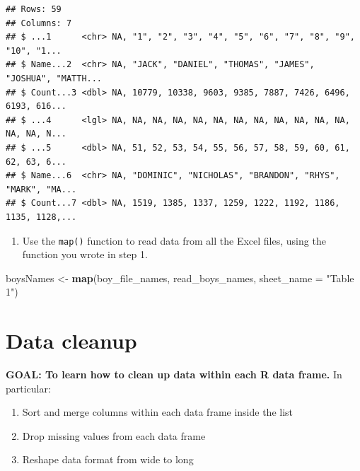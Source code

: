 \documentclass[
]{book}
\newenvironment{Shaded}{\begin{snugshade}}{\end{snugshade}}
\newcommand{\DataTypeTok}[1]{\textcolor[rgb]{0.13,0.29,0.53}{#1}}
\newcommand{\KeywordTok}[1]{\textcolor[rgb]{0.13,0.29,0.53}{\textbf{#1}}}
\newcommand{\NormalTok}[1]{#1}
\newcommand{\StringTok}[1]{\textcolor[rgb]{0.31,0.60,0.02}{#1}}
\providecommand{\tightlist}{%
  \setlength{\itemsep}{0pt}\setlength{\parskip}{0pt}}
\begin{document}
\begin{alert}
\begin{verbatim}
## Rows: 59
## Columns: 7
## $ ...1      <chr> NA, "1", "2", "3", "4", "5", "6", "7", "8", "9", "10", "1...
## $ Name...2  <chr> NA, "JACK", "DANIEL", "THOMAS", "JAMES", "JOSHUA", "MATTH...
## $ Count...3 <dbl> NA, 10779, 10338, 9603, 9385, 7887, 7426, 6496, 6193, 616...
## $ ...4      <lgl> NA, NA, NA, NA, NA, NA, NA, NA, NA, NA, NA, NA, NA, NA, N...
## $ ...5      <dbl> NA, 51, 52, 53, 54, 55, 56, 57, 58, 59, 60, 61, 62, 63, 6...
## $ Name...6  <chr> NA, "DOMINIC", "NICHOLAS", "BRANDON", "RHYS", "MARK", "MA...
## $ Count...7 <dbl> NA, 1519, 1385, 1337, 1259, 1222, 1192, 1186, 1135, 1128,...
\end{verbatim}

\begin{enumerate}
\def\labelenumi{\arabic{enumi}.}
\setcounter{enumi}{2}
\tightlist
\item
  Use the \texttt{map()} function to read data from all the Excel files, using the function you wrote in step 1.
\end{enumerate}

\begin{Shaded}
\begin{Highlighting}[]
\NormalTok{boysNames \textless{}{-}}\StringTok{ }\KeywordTok{map}\NormalTok{(boy\_file\_names, read\_boys\_names, }\DataTypeTok{sheet\_name =} \StringTok{"Table 1"}\NormalTok{)}
\end{Highlighting}
\end{Shaded}

\end{alert}

\hypertarget{data-cleanup}{%
\section{Data cleanup}\label{data-cleanup}}

\begin{alert}

\textbf{GOAL: To learn how to clean up data within each R data frame.} In particular:

\begin{enumerate}
\def\labelenumi{\arabic{enumi}.}
\tightlist
\item
  Sort and merge columns within each data frame inside the list
\item
  Drop missing values from each data frame
\item
  Reshape data format from wide to long
\end{enumerate}

\end{alert}
\end{document}
